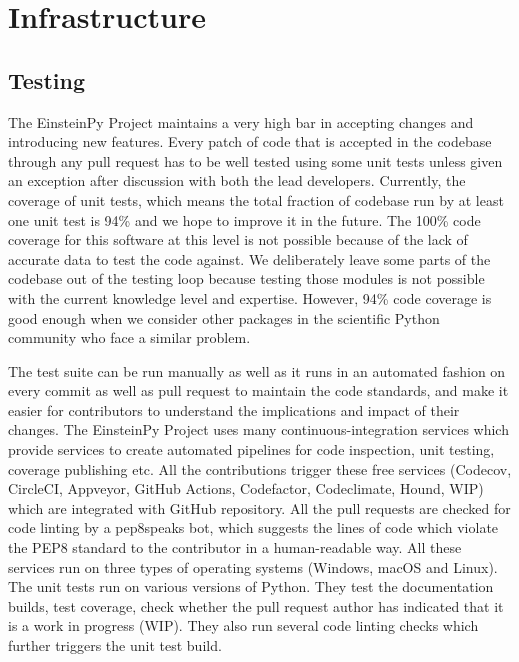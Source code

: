 \documentclass[refree]{aa}
\begin{document}
\section{Infrastructure} \label{sec:infra}
\subsection{Testing} \label{subsec:testing}
The EinsteinPy Project maintains a very high bar in accepting changes and introducing new features. Every patch of code that is accepted in the codebase through any pull request has to be well tested using some unit tests unless given an exception after discussion with both the lead developers. Currently, the coverage of unit tests, which means the total fraction of codebase run by at least one unit test is 94\% and we hope to improve it in the future. The 100\% code coverage for this software at this level is not possible because of the lack of accurate data to test the code against. We deliberately leave some parts of the codebase out of the testing loop because testing those modules is not possible with the current knowledge level and expertise. However, 94\% code coverage is good enough when we consider other packages in the scientific Python community who face a similar problem.  

The test suite can be run manually as well as it runs in an automated fashion on every commit as well as pull request to maintain the code standards, and make it easier for contributors to understand the implications and impact of their changes. The EinsteinPy Project uses many continuous-integration services which provide services to create automated pipelines for code inspection, unit testing, coverage publishing etc. All the contributions trigger these free services (Codecov, CircleCI, Appveyor, GitHub Actions, Codefactor, Codeclimate, Hound, WIP) which are integrated with GitHub repository. All the pull requests are checked for code linting by a pep8speaks bot, which suggests the lines of code which violate the PEP8 standard to the contributor in a human-readable way. All these services run on three types of operating systems (Windows, macOS and Linux). The unit tests run on various versions of Python. They test the documentation builds, test coverage, check whether the pull request author has indicated that it is a work in progress (WIP). They also run several code linting checks which further triggers the unit test build.
\end{document}
